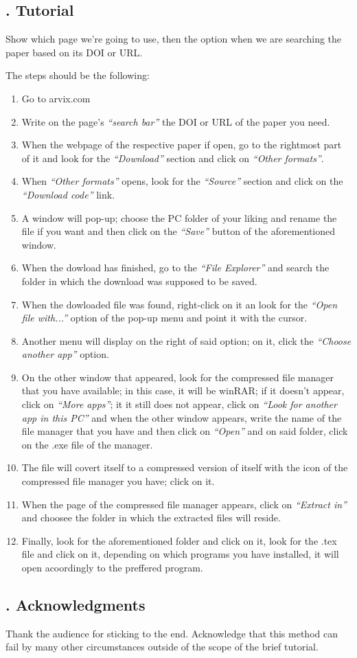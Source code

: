 \documentclass[letterpaper, 12pt]{article}
\begin{document}
\subsection*{{. Tutorial}}
Show which page we're going to use, then the option when we are searching the paper based on its DOI or URL.\par
The steps should be the following:
\begin{enumerate}
    \item Go to arvix.com
    \item Write on the page's \emph{``search bar''} the DOI or URL of the paper you need.
    \item When the webpage of the respective paper if open, go to the rightmost part of it and look for the \emph{``Download''} section and click on \emph{``Other formats''}.
    \item When \emph{``Other formats''} opens, look for the \emph{``Source''} section and click on the \emph{``Download code''} link.
    \item A window will pop-up; choose the PC folder of your liking and rename the file if you want and then click on the \emph{``Save''} button of the aforementioned window.
    \item When the dowload has finished, go to the \emph{``File Explorer''} and search the folder in which the download was supposed to be saved.
    \item When the dowloaded file was found, right-click on it an look for the \emph{``Open file with...''} option of the pop-up menu and point it with the cursor.
    \item Another menu will display on the right of said option; on it, click the \emph{``Choose another app''} option.
    \item On the other window that appeared, look for the compressed file manager that you have available; in this case, it will be winRAR; if it doesn't appear, click on \emph{``More apps''}; it it still does not appear, click on \emph{``Look for another app in this PC''} and when the other window appears, write the name of the file manager that you have and then click on \emph{``Open''} and on said folder, click on the .exe file of the manager.
    \item The file will covert itself to a compressed version of itself with the icon of the compressed file manager you have; click on it.
    \item When the page of the compressed file manager appears, click on \emph{``Extract in''} and choosee the folder in which the extracted files will reside.
    \item Finally, look for the aforementioned folder and click on it, look for the .tex file and click on it, depending on which programs you have installed, it will open acoordingly to the preffered program.
\end{enumerate}\par
\subsection*{{. Acknowledgments}}
Thank the audience for sticking to the end. Acknowledge that this method can fail by many other circumstances outside of the scope of the  brief tutorial.
\end{document}

